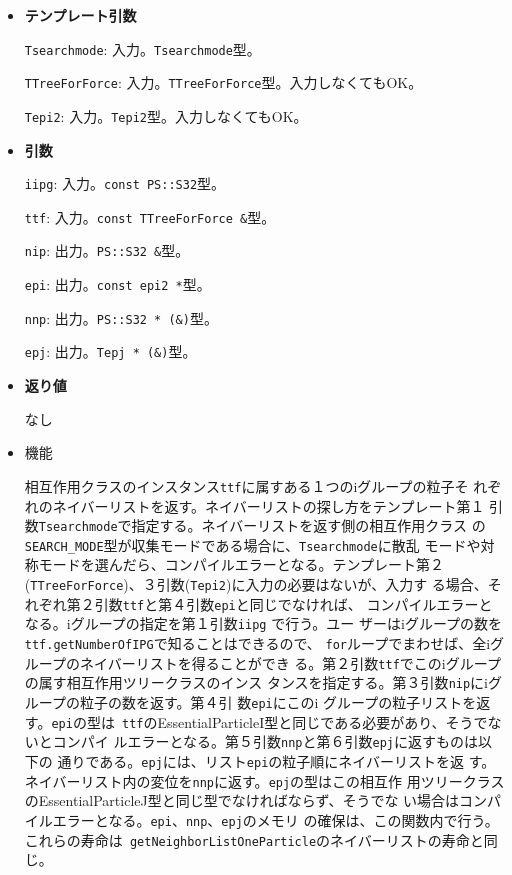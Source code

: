 \begin{itemize}

\item{{\bf テンプレート引数}}

{\tt Tsearchmode}: 入力。{\tt Tsearchmode}型。

{\tt TTreeForForce}: 入力。{\tt TTreeForForce}型。入力しなくてもOK。

{\tt Tepi2}: 入力。{\tt Tepi2}型。入力しなくてもOK。

\item{{\bf 引数}}

{\tt iipg}: 入力。{\tt const PS::S32}型。

{\tt ttf}: 入力。{\tt const TTreeForForce \&}型。

{\tt nip}: 出力。{\tt PS::S32 \&}型。

{\tt epi}: 出力。{\tt const epi2 *}型。

{\tt nnp}: 出力。{\tt PS::S32 * (\&)}型。

{\tt epj}: 出力。{\tt Tepj * (\&)}型。

\item{{\bf 返り値}}

なし

\item 機能

相互作用クラスのインスタンス{\tt ttf}に属すある１つのiグループの粒子そ
れぞれのネイバーリストを返す。ネイバーリストの探し方をテンプレート第１
引数{\tt Tsearchmode}で指定する。ネイバーリストを返す側の相互作用クラス
の{\tt SEARCH\_MODE}型が収集モードである場合に、{\tt Tsearchmode}に散乱
モードや対称モードを選んだら、コンパイルエラーとなる。テンプレート第２
({\tt TTreeForForce})、３引数({\tt Tepi2})に入力の必要はないが、入力す
る場合、それぞれ第２引数{\tt ttf}と第４引数{\tt epi}と同じでなければ、
コンパイルエラーとなる。iグループの指定を第１引数{\tt iipg} で行う。ユー
ザーはiグループの数を{\tt ttf.getNumberOfIPG}で知ることはできるので、
{\tt for}ループでまわせば、全iグループのネイバーリストを得ることができ
る。第２引数{\tt ttf}でこのiグループの属す相互作用ツリークラスのインス
タンスを指定する。第３引数{\tt nip}にiグループの粒子の数を返す。第４引
数{\tt epi}にこのi グループの粒子リストを返す。{\tt epi}の型は{\tt
ttf}のEssentialParticleI型と同じである必要があり、そうでないとコンパイ
ルエラーとなる。第５引数{\tt nnp}と第６引数{\tt epj}に返すものは以下の
通りである。{\tt epj}には、リスト{\tt epi}の粒子順にネイバーリストを返
す。ネイバーリスト内の変位を{\tt nnp}に返す。{\tt epj}の型はこの相互作
用ツリークラスのEssentialParticleJ型と同じ型でなければならず、そうでな
い場合はコンパイルエラーとなる。{\tt epi}、{\tt nnp}、{\tt epj}のメモリ
の確保は、この関数内で行う。これらの寿命は{\tt
getNeighborListOneParticle}のネイバーリストの寿命と同じ。

\end{itemize}

